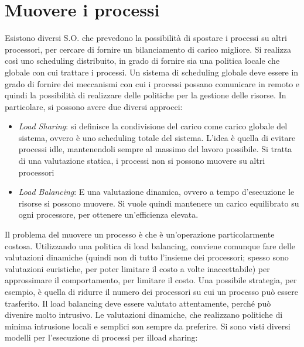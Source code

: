 \section{Muovere i processi}
Esistono diversi S.O. che prevedono la possibilità di spostare i processi su altri processori, per cercare di fornire un
bilanciamento di carico migliore. Si realizza così uno scheduling distribuito, in grado di fornire sia una politica
locale che globale con cui trattare i processi. Un sistema di scheduling globale deve essere in grado di fornire dei
meccanismi con cui i processi possano comunicare in remoto e quindi la possibilità di realizzare delle politiche per la
gestione delle risorse.
In particolare, si possono avere due diversi approcci:
\begin{itemize}
 \item \textit{Load Sharing}: si definisce la condivisione del carico come carico globale del sistema, ovvero è uno
 scheduling totale del sistema. L'idea è quella di evitare processi idle, mantenendoli sempre al massimo del lavoro
 possibile. Si tratta di una valutazione statica, i processi non si possono muovere su altri processori
 \item \textit{Load Balancing}: E una valutazione dinamica, ovvero a tempo d'esecuzione le risorse si possono muovere.
 Si vuole quindi mantenere un carico equilibrato su ogni processore, per ottenere un'efficienza elevata.
\end{itemize}
Il problema del muovere un processo è che è un'operazione particolarmente costosa. Utilizzando una politica di load
balancing, conviene comunque fare delle valutazioni dinamiche (quindi non di tutto l'insieme dei processori; spesso sono
valutazioni euristiche, per poter limitare il costo a volte inaccettabile) per approssimare il comportamento, per
limitare il costo. Una possibile strategia, per esempio, è quella di ridurre il numero dei processori su cui un processo
può essere trasferito. Il load balancing deve essere valutato attentamente, perché può divenire molto intrusivo. Le
valutazioni dinamiche, che realizzano politiche di minima intrusione locali e semplici son sempre da preferire.
Si sono visti diversi modelli per l'esecuzione di processi per ilload sharing:
